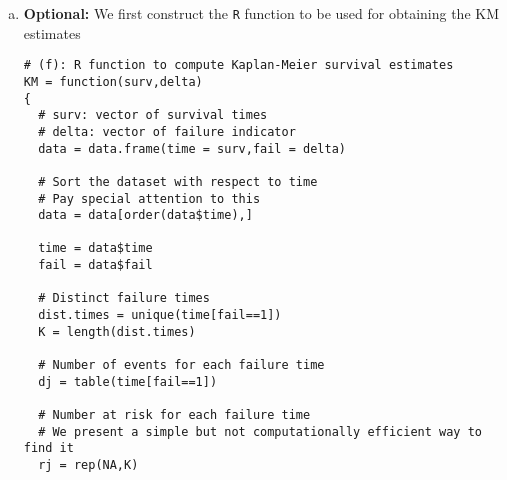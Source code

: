 \begin{enumerate}[(a)]
\begin{spacing}{1.2}
\begin{footnotesize}
\begin{verbatim}
> setwd("C:/Applied_Survival_Analysis_Jan2016/lab2/graphs")
> 
> #Plot of the survival
> pdf("nhact_surv.pdf",height = 5.5,width = 5.5)
> plot(los100[-(lt+1)],nursLT[,5], type="s", 
+      ylab="Survival", xlab="LOS (100-day intervals)")
> dev.off()
RStudioGD 
        2 
> 
> #Plot of the hazard
> pdf("nhact_haz.pdf",height = 5.5, width = 5.5)
> plot(los100[-(lt+1)],nursLT[,7], type="s", 
+      ylab="Hazard", xlab="LOS (100-day intervals)")
> dev.off()
RStudioGD 
        2 
\end{verbatim}
\end{footnotesize}
\end{spacing}

\begin{figure}[htbp]
	\centering
		\texttt{[image: nhact\_surv.pdf]}
	\caption{Estimated survival function in treated nursing homes.}
	\label{figure3}
\end{figure}

\begin{figure}[htbp]
	\centering
		\texttt{[image: nhact\_haz.pdf]}
	\caption{Estimated hazard function in treated nursing homes.}
	\label{figure4}
\end{figure}
\newpage    
\item \textbf{Optional:} We first construct the \verb|R| function to be used for obtaining the KM estimates
\begin{footnotesize}
\begin{verbatim}
# (f): R function to compute Kaplan-Meier survival estimates
KM = function(surv,delta)
{
  # surv: vector of survival times
  # delta: vector of failure indicator
  data = data.frame(time = surv,fail = delta)
  
  # Sort the dataset with respect to time
  # Pay special attention to this
  data = data[order(data$time),]
  
  time = data$time
  fail = data$fail
  
  # Distinct failure times
  dist.times = unique(time[fail==1])
  K = length(dist.times)
  
  # Number of events for each failure time
  dj = table(time[fail==1])
  
  # Number at risk for each failure time
  # We present a simple but not computationally efficient way to find it
  rj = rep(NA,K)
  

\end{verbatim}
\end{footnotesize}
\end{enumerate}
